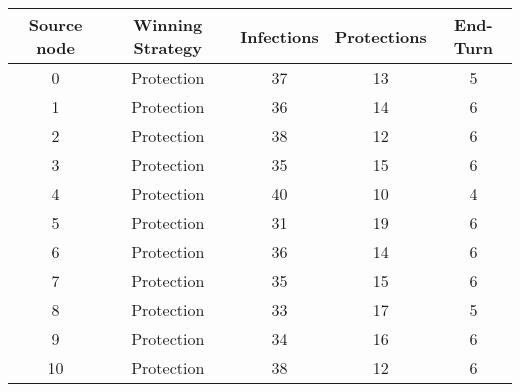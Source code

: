 \documentclass[results.tex]{subfiles}
\begin{document}
    \begin{center}
        \begin{tabular}{| c || c | c | c | c |}
            \hline
            {\bfseries Source node} & {\bfseries Winning Strategy} & {\bfseries Infections} & {\bfseries Protections}
            & {\bfseries End-Turn}
            \\  %
            \hline\hline
            0                       & Protection                   & 37                     & 13                      & 5                    \\
            \hline
            1                       & Protection                   & 36                     & 14                      & 6                    \\
            \hline
            2                       & Protection                   & 38                     & 12                      & 6                    \\
            \hline
            3                       & Protection                   & 35                     & 15                      & 6                    \\
            \hline
            4                       & Protection                   & 40                     & 10                      & 4                    \\
            \hline
            5                       & Protection                   & 31                     & 19                      & 6                    \\
            \hline
            6                       & Protection                   & 36                     & 14                      & 6                    \\
            \hline
            7                       & Protection                   & 35                     & 15                      & 6                    \\
            \hline
            8                       & Protection                   & 33                     & 17                      & 5                    \\
            \hline
            9                       & Protection                   & 34                     & 16                      & 6                    \\
            \hline
            10                      & Protection                   & 38                     & 12                      & 6                    \\

\end{tabular}
\end{center}
\end{document}
